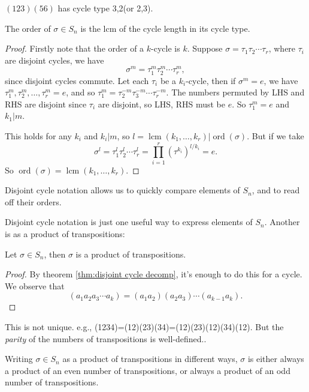 \documentclass[10pt]{article}
\DeclareMathOperator{\ord}{ord}
\DeclareMathOperator{\lcm}{lcm}
\begin{document}
    \begin{example}
        $ (123)(56) $ has cycle type 3,2(or 2,3).
    \end{example}
    \begin{theorem}\label{thm:lcm of cycle type is order}
        The order of $ \sigma\in S_n $ is the lcm of the cycle length in its cycle type.
    \end{theorem}
    \begin{proof}
        Firstly note that the order of a $k$-cycle is $k$. Suppose $ \sigma= \tau_1 \tau_2\cdots \tau_r $, where $ \tau_i $ are disjoint cycles, we have 
        \[
            \sigma^m = \tau^m_1 \tau^m_2\cdots \tau^m_r
        ,\]
        since disjoint cycles commute. Let each $ \tau_i $ be a $k_i$-cycle, then if $ \sigma^m=e $, we have $ \tau^m_1,\tau^m_2,\dots,\tau^m_r=e $, and so $ \tau_1^m=\tau_2^{-m}\tau_{3}^{-m}\cdots \tau_{r}^{-m} $. The numbers permuted by LHS and RHS are disjoint since $ \tau_i $ are disjoint, so LHS, RHS must be $e$. So $ \tau_1^m=e $ and $ k_1|m$.

        This holds for any $k_i$ and $k_i|m$, so $ l=\lcm (k_1,\dots,k_r)| \ord(\sigma) $. But if we take
        \[
            \sigma^{l}=\tau^l_1 \tau^l_2\cdots \tau^l_r = \prod_{i=1}^r (\tau^{k_i})^{l/k_i}=e
        .\]
        So $ \ord(\sigma)=\lcm (k_1,\dots,k_r) $.
    \end{proof}
    \begin{remark}
        Disjoint cycle notation allows us to quickly compare elements of $S_n$, and to read off their orders.
    \end{remark}
    Disjoint cycle notation is just one useful way to express elements of $S_n$. Another is as a product of transpositions:
    \begin{proposition}\label{prop:2.16}
        Let $ \sigma\in S_n $, then $\sigma$ is a product of transpositions.
    \end{proposition}
    \begin{proof}
        By theorem \ref{thm:disjoint cycle decomp}, it's enough to do this for a cycle. We observe that 
        \[
            (a_1 a_2 a_3 \cdots a_k)=(a_1a_2)(a_2a_3)\cdots(a_{k-1}a_k)
        .\]
    \end{proof}
    \begin{remark}
        This is not unique. e.g., (1234)=(12)(23)(34)=(12)(23)(12)(34)(12). But the \textit{parity} of the numbers of transpositions is well-defined..
    \end{remark}
    \begin{theorem}\label{thm:parity_transposition}
        Writing $ \sigma\in S_n $ as a product of transpositions in different ways, $\sigma$ is either always a product of an even number of transpositions, or always a product of an odd number of transpositions.
    \end{theorem}
\end{document}
